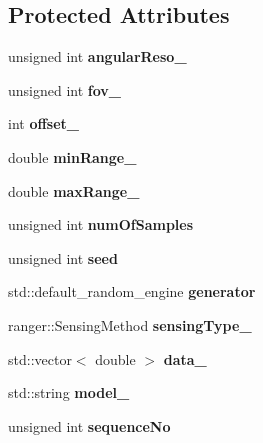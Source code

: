 \subsection*{Protected Attributes}
\begin{DoxyCompactItemize}
\item 
unsigned int {\bfseries angular\+Reso\+\_\+}\hypertarget{classRanger_a53534cf242b7da6e4766016c24876d55}{}\label{classRanger_a53534cf242b7da6e4766016c24876d55}

\item 
unsigned int {\bfseries fov\+\_\+}\hypertarget{classRanger_a013937201e2a4a516d4d36cac0193d68}{}\label{classRanger_a013937201e2a4a516d4d36cac0193d68}

\item 
int {\bfseries offset\+\_\+}\hypertarget{classRanger_add17fe15ea0db50db1f678f9949cfc87}{}\label{classRanger_add17fe15ea0db50db1f678f9949cfc87}

\item 
double {\bfseries min\+Range\+\_\+}\hypertarget{classRanger_a3dddeb9eb109baf567dfcd356706c6fb}{}\label{classRanger_a3dddeb9eb109baf567dfcd356706c6fb}

\item 
double {\bfseries max\+Range\+\_\+}\hypertarget{classRanger_aa92901df85f1818f27c0cf2e56ac2667}{}\label{classRanger_aa92901df85f1818f27c0cf2e56ac2667}

\item 
unsigned int {\bfseries num\+Of\+Samples}\hypertarget{classRanger_a19d2d3776438ff0fe7060d3fcdc46111}{}\label{classRanger_a19d2d3776438ff0fe7060d3fcdc46111}

\item 
unsigned int {\bfseries seed}\hypertarget{classRanger_a3d56c77b50d945e89809cae1a93d0046}{}\label{classRanger_a3d56c77b50d945e89809cae1a93d0046}

\item 
std\+::default\+\_\+random\+\_\+engine {\bfseries generator}\hypertarget{classRanger_aa8678414feb7c07f6aee40d889619064}{}\label{classRanger_aa8678414feb7c07f6aee40d889619064}

\item 
ranger\+::\+Sensing\+Method {\bfseries sensing\+Type\+\_\+}\hypertarget{classRanger_a59c4423a891952a753560b2dc79aa3c5}{}\label{classRanger_a59c4423a891952a753560b2dc79aa3c5}

\item 
std\+::vector$<$ double $>$ {\bfseries data\+\_\+}\hypertarget{classRanger_adef7fed47f032646f5023046de0bbc48}{}\label{classRanger_adef7fed47f032646f5023046de0bbc48}

\item 
std\+::string {\bfseries model\+\_\+}\hypertarget{classRanger_a806db893039467e1f6f66335e8eabb7b}{}\label{classRanger_a806db893039467e1f6f66335e8eabb7b}

\item 
unsigned int {\bfseries sequence\+No}\hypertarget{classRanger_a8bb86299b941e0e0b38c958f214641ea}{}\label{classRanger_a8bb86299b941e0e0b38c958f214641ea}

\end{DoxyCompactItemize}


